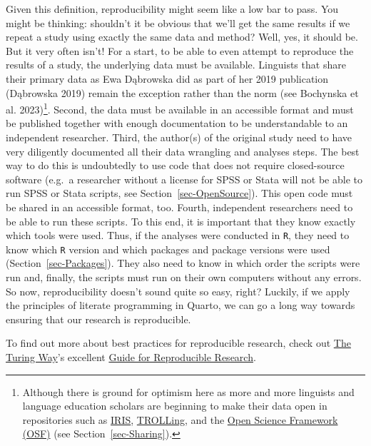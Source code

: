 \documentclass[
  letterpaper,
  DIV=11,
  numbers=noendperiod]{scrreprt}
\begin{document}
Given this definition, reproducibility might seem like a low bar to
pass. You might be thinking: shouldn't it be obvious that we'll get the
same results if we repeat a study using exactly the same data and
method? Well, yes, it should be. But it very often isn't! For a start,
to be able to even attempt to reproduce the results of a study, the
underlying data must be available. Linguists that share their primary
data as Ewa Dąbrowska did as part of her 2019 publication (Dąbrowska
2019) remain the exception rather than the norm (see Bochynska et al.
2023)\footnote{Although there is ground for optimism here as more and
  more linguists and language education scholars are beginning to make
  their data open in repositories such as
  \href{https://www.iris-database.org/}{IRIS},
  \href{https://dataverse.no/dataverse/trolling}{TROLLing}, and the
  \href{https://osf.io/}{Open Science Framework (OSF)} (see
  Section~\ref{sec-Sharing}).}. Second, the data must be available in an
accessible format and must be published together with enough
documentation to be understandable to an independent researcher. Third,
the author(s) of the original study need to have very diligently
documented all their data wrangling and analyses steps. The best way to
do this is undoubtedly to use code that does not require closed-source
software (e.g.~a researcher without a license for SPSS or Stata will not
be able to run SPSS or Stata scripts, see Section~\ref{sec-OpenSource}).
This open code must be shared in an accessible format, too. Fourth,
independent researchers need to be able to run these scripts. To this
end, it is important that they know exactly which tools were used. Thus,
if the analyses were conducted in \texttt{R}, they need to know which
\texttt{R} version and which packages and package versions were used
(Section~\ref{sec-Packages}). They also need to know in which order the
scripts were run and, finally, the scripts must run on their own
computers without any errors. So now, reproducibility doesn't sound
quite so easy, right? Luckily, if we apply the principles of literate
programming in Quarto, we can go a long way towards ensuring that our
research is reproducible.

\begin{tcolorbox}[enhanced jigsaw, arc=.35mm, bottomrule=.15mm, bottomtitle=1mm, breakable, colback=white, colbacktitle=quarto-callout-note-color!10!white, colframe=quarto-callout-note-color-frame, coltitle=black, left=2mm, leftrule=.75mm, opacityback=0, opacitybacktitle=0.6, rightrule=.15mm, title=\textcolor{quarto-callout-note-color}{\faInfo}\hspace{0.5em}{Going further \emoji{rocket}}, titlerule=0mm, toprule=.15mm, toptitle=1mm]

To find out more about best practices for reproducible research, check
out \href{https://book.the-turing-way.org/}{The Turing Way}'s excellent
\href{https://book.the-turing-way.org/reproducible-research/reproducible-research}{Guide
for Reproducible Research}.

\end{tcolorbox}
\end{document}
